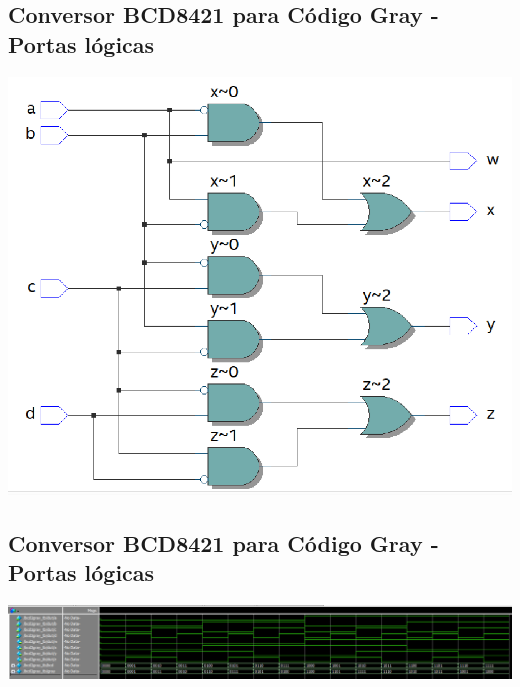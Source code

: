 \documentclass{article}
\begin{document}
\subsection{Conversor BCD8421 para Código Gray - Portas lógicas}
\includegraphics[width=1\textwidth]{bcd2gray-rtl.png}

\subsection{Conversor BCD8421 para Código Gray - Portas lógicas}
\includegraphics[width=1\textwidth]{bcd2gray-wave.png}
\end{document}
